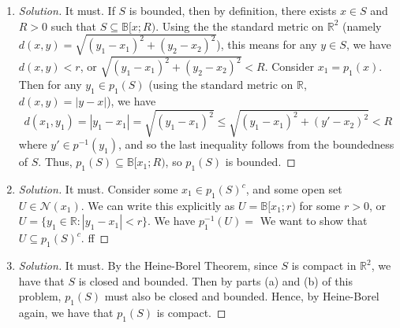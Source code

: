 \documentclass{article}
\newcommand{\R}{{\mathbb R}}
\begin{document}
\begin{enumerate}
	\item \begin{proof}[Solution]\let\qed\relax
		It must. If $S$ is bounded, then by definition,
		there exists $x \in S$ and $R>0$ such that
		$S \subseteq \mathbb{B}[x;R)$.
		Using the the standard metric on $\R^2$
		(namely $d(x,y) = \sqrt{(y_1 - x_1)^2 + (y_2 - x_2)^2}$),
		this means for any $y \in S$, we have
		$d(x,y) < r$, or $\sqrt{(y_1 - x_1)^2 + (y_2 - x_2)^2} < R$.
		Consider $x_1 = p_1(x)$.
		Then for any $y_1 \in p_1(S)$
		(using the standard metric on $\R$, $d(x,y) = |y-x|$), we have
		\[
			d(x_1,y_1) = |y_1 - x_1| = \sqrt{(y_1-x_1)^2}
			\leq \sqrt{(y_1-x_1)^2 + (y' - x_2)^2} < R
		\]
		where $y' \in p^{-1}(y_1)$,
		and so the last inequality follows from the boundedness of $S$.
		Thus, $p_1(S) \subseteq \mathbb{B}[x_1;R)$,
		so $p_1(S)$ is bounded.
	\end{proof}
	\item \begin{proof}[Solution]\let\qed\relax
		It must. Consider some $x_1 \in p_1(S)^c$,
		and some open set $U \in \mathcal{N}(x_1)$.
		We can write this explicitly as $U = \mathbb{B}[x_1;r)$
		for some $r>0$,
		or $U = \{y_1 \in \R \colon |y_1 - x_1| < r\}$.
		We have $p_1^{-1}(U) = $
		We want to show that $U \subseteq p_1(S)^c$.
		ff
	\end{proof}
	\item \begin{proof}[Solution]\let\qed\relax
		It must.
		By the Heine-Borel Theorem,
		since $S$ is compact in $\R^2$, we have that $S$ is closed and bounded.
		Then by parts (a) and (b) of this problem,
		$p_1(S)$ must also be closed and bounded.
		Hence, by Heine-Borel again,
		we have that $p_1(S)$ is compact.
	\end{proof}
\end{enumerate}
\clearpage
~\clearpage
\end{document}

